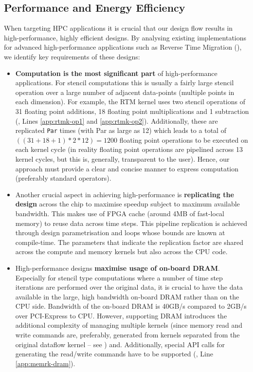 \subsection{Performance and Energy Efficiency}
When targeting HPC applications it is crucial that our design flow
results in high-performance, highly efficient designs. By analysing
existing implementations for advanced high-performance applications
such as Reverse Time Migration (), we identify key
requirements of these designs:

\begin{itemize}

\item \textbf{Computation is the most significant part} of
  high-performance applications. For stencil computations this is
  usually a fairly large stencil operation over a large number of
  adjacent data-points (multiple points in each dimension). For
  example, the RTM kernel uses two stencil operations of 31 floating
  point additions, 18 floating point multiplications and 1
  subtraction (, Lines \ref{app:rtmk-op1} and
  \ref{app:rtmk-op2}).  Additionally, these are replicated
  \texttt{Par} times (with Par as large as 12) which leads to a total
  of $((31 + 18 + 1) * 2 * 12) = 1200 $ floating point operations to
  be executed on each kernel cycle (in reality floating point
  operations are pipelined across 13 kernel cycles, but this is,
  generally, transparent to the user). Hence, our approach must
  provide a clear and concise manner to express computation
  (preferably standard operators).

\item Another crucial aspect in achieving high-performance is
  \textbf{replicating the design} across the chip to maximise speedup
  subject to maximum available bandwidth. This makes use of FPGA cache
  (around 4MB of fast-local memory) to reuse data across time
  steps. This pipeline replication is achieved through design
  parametrisation and loops whose bounds are known at
  compile-time. The parameters that indicate the replication factor are
  shared across the compute and memory kernels but also across the CPU
  code.

\item High-performance designs \textbf{maximise usage of on-board
    DRAM}. Especially for stencil type computations where a number of
  time step iterations are performed over the original data, it is
  crucial to have the data available in the large, high bandwidth
  on-board DRAM rather than on the CPU side. Bandwidth of the on-board
  DRAM is 40GB/s compared to 2GB/s over PCI-Express to CPU. However,
  supporting DRAM introduces the additional complexity of managing
  multiple kernels (since memory read and write commands are,
  preferably, generated from kernels separated from the original
  dataflow kernel -- see )
  and. Additionally, special API calls for generating the read/write
  commands have to be supported (, Line
  \ref{app:memrk-dram}).


\end{itemize}
